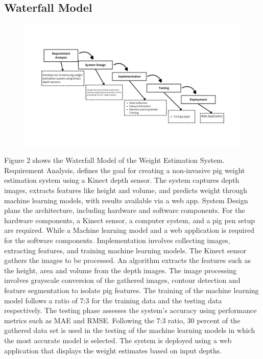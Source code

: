 {\subsection { Waterfall Model}
\begin{figure}[h]
	\centering
	\includegraphics[height=0.4\textheight]{figures/Requirement Analysis (4)}
	\caption{}
	\label{fig:Waterfall Model}
\end{figure}

Figure 2 shows the Waterfall Model of the Weight Estimation System. Requirement Analysis, defines the goal for creating a non-invasive pig weight estimation system using a Kinect depth sensor. The system captures depth images, extracts features like height and volume, and predicts weight through machine learning models, with results available via a web app. System Design plans the architecture, including hardware and software components. For the hardware components, a Kinect sensor, a computer system, and a pig pen setup are required. While a Machine learning model and a web application is required for the software components. Implementation involves collecting images, extracting features, and training machine learning models. The Kinect sensor gathers the images to be processed. An algorithm extracts the features such as the height, area and volume from the depth images. The image processing involves grayscale conversion of the gathered images, contour detection and feature segmentation to isolate pig features. The training of the machine learning model follows a ratio of 7:3 for the training data and the testing data respectively. The testing phase assesses the system's accuracy using performance metrics such as MAE and RMSE. Following the 7:3 ratio, 30 percent of the gathered data set is used in the testing of the machine learning models in which the most accurate model is selected. The system is deployed using a web application that displays the weight estimates based on input depths.
\newpage
}

